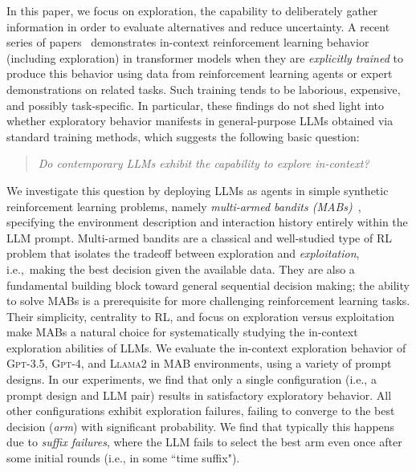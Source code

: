 \documentclass[11pt]{article}
\newcommand{\gptfour}{\textsc{Gpt-4}\xspace}
\newcommand{\gptthree}{\textsc{Gpt-3.5}\xspace}
\newcommand{\llama}{\textsc{Llama2}\xspace}
\newcommand{\xhdr}[1]{\vspace{2mm} \noindent{\bf #1}}
\newcommand{\ie}{{i.e.,~\xspace}}
\begin{document}
In this paper, we focus on exploration, the capability to deliberately gather information in order to evaluate alternatives and reduce uncertainty.
A recent series of papers~\citep{laskin2022context,lee2023supervised,raparthy2023generalization} demonstrates in-context reinforcement learning behavior (including exploration) in transformer models when they are \emph{explicitly trained} to produce this behavior using data from reinforcement learning agents or expert demonstrations on related tasks.
Such training tends to be laborious, expensive, and possibly task-specific.
In particular, these findings do not shed light into whether exploratory behavior manifests in general-purpose LLMs obtained via standard training methods, which suggests the following basic question:
\begin{quote}
\begin{center}
  \emph{Do contemporary LLMs exhibit the capability to explore in-context?}
\end{center}
\end{quote}
\xhdr{Contributions.}
We investigate this question by deploying
LLMs as agents in simple synthetic reinforcement learning problems, namely \emph{multi-armed bandits (MABs)}~\citep{slivkins-MABbook,LS19bandit-book}, specifying the environment description and interaction history entirely within the LLM prompt.
Multi-armed bandits are a classical and well-studied type of RL problem that isolates the tradeoff between exploration and \emph{exploitation}, \ie making the best decision given the available data.
They are also a fundamental building block toward general sequential decision making; the ability to solve MABs is a prerequisite for more challenging reinforcement learning tasks.
Their simplicity, centrality to RL, and focus on exploration versus exploitation make MABs a natural choice for systematically studying the in-context exploration abilities of LLMs.
We evaluate the in-context exploration behavior of \gptthree \citep{gpt3-neurips20}, \gptfour \citep{achiam2023gpt}, and \llama \citep{touvron2023llama} in MAB environments, using a variety of prompt designs.
In our experiments, we find that only a single configuration (i.e., a prompt design and LLM pair) results in satisfactory exploratory behavior.
All other configurations exhibit
exploration failures, failing to converge to the best decision (\emph{arm}) with significant probability.
We find that typically this happens due to \emph{suffix failures}, where the LLM fails to select the best arm even once after some initial rounds (i.e., in some ``time suffix").
\end{document}
